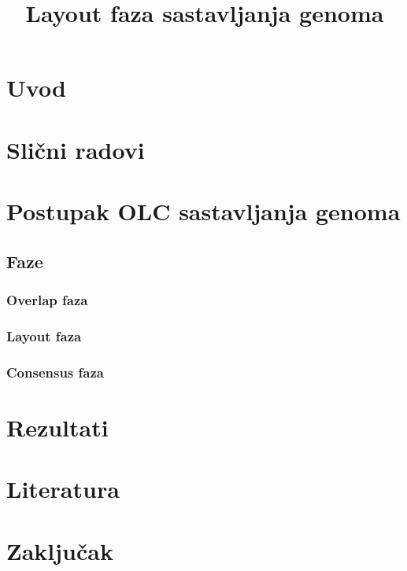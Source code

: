 \documentclass[10pt, a4paper]{article}
\title{Layout faza sastavljanja genoma}
\begin{document}
\maketitleabstract

\section{Uvod}


\section{Slični radovi}


\section{Postupak OLC sastavljanja genoma}


\subsection{Faze}

\subsubsection{Overlap faza}

\subsubsection{Layout faza}

\subsubsection{Consensus faza}

\section{Rezultati}

\section{Literatura}

\section{Zaključak}


 
\end{document}
